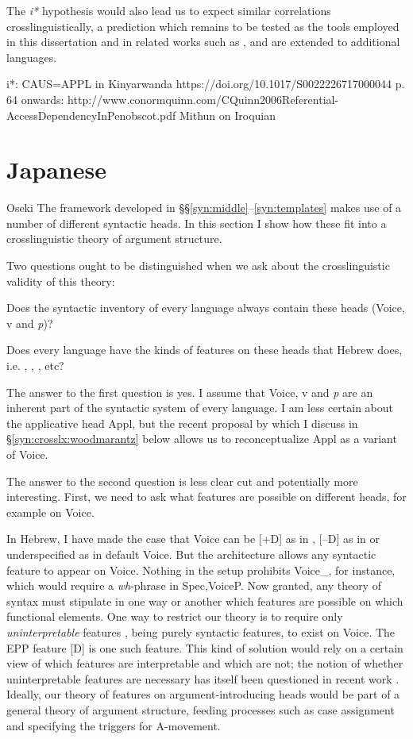 The \emph{i*} hypothesis would also lead us to expect similar correlations crosslinguistically, a prediction which remains to be tested as the tools employed in this dissertation and in related works such as \cite{schaefer08}, \cite{spathasetal15} and \cite{wood15springer} are extended to additional languages.


i*: CAUS=APPL in Kinyarwanda https://doi.org/10.1017/S0022226717000044
p. 64 onwards: http://www.conormquinn.com/CQuinn2006Referential-AccessDependencyInPenobscot.pdf
Mithun on Iroquian

\section{Japanese}
Oseki
The framework developed in \S\S\ref{syn:middle}--\ref{syn:templates} makes use of a number of different syntactic heads. In this section I show how these fit into a crosslinguistic theory of argument structure.

Two questions ought to be distinguished when we ask about the crosslinguistic validity of this theory:
\begin{enumerate*}
	\item Does the syntactic inventory of every language always contain these heads (Voice, v and \emph{p})?
	\item Does every language have the kinds of features on these heads that Hebrew does, i.e. {\vd}, \pz, \va, etc?
\end{enumerate*}
The answer to the first question is yes. I assume that Voice, v and \emph{p} are an inherent part of the syntactic system of every language. I am less certain about the applicative head Appl, but the recent proposal by \cite{woodmarantz15} which I discuss in \S\ref{syn:crosslx:woodmarantz} below allows us to reconceptualize Appl as a variant of Voice.

The answer to the second question is less clear cut and potentially more interesting. First, we need to ask what features are possible on different heads, for example on Voice.

In Hebrew, I have made the case that Voice can be [+D] as in \vd, [--D] as in {\vz} or underspecified as in default Voice. But the architecture allows any syntactic feature to appear on Voice. Nothing in the setup prohibits Voice_{\text{[wh]}}, for instance, which would require a \emph{wh}-phrase in Spec,VoiceP. Now granted, any theory of syntax must stipulate in one way or another which features are possible on which functional elements. One way to restrict our theory is to require only \emph{uninterpretable} features \citep{chomsky95}, being purely syntactic features, to exist on Voice. The EPP feature [D] is one such feature. This kind of solution would rely on a certain view of which features are interpretable and which are not; the notion of whether uninterpretable features are necessary has itself been questioned in recent work \citep{preminger14mit}. Ideally, our theory of features on argument-introducing heads would be part of a general theory of argument structure, feeding processes such as case assignment and specifying the triggers for A-movement.

